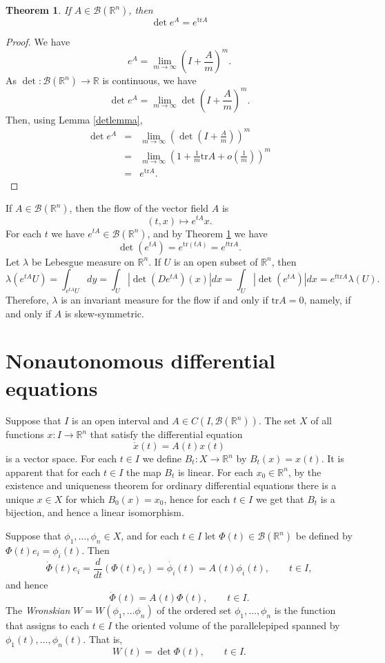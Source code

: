 \documentclass{article}
\newcommand{\tr}{\textrm{tr}}
\newtheorem{theorem}{Theorem}
\begin{document}
\begin{theorem}
If $A \in \mathscr{B}(\mathbb{R}^n)$, then
\[
\det e^A = e^{\tr A}
\]
\label{dettheorem}
\end{theorem}
\begin{proof}
We have
\[
e^A=\lim_{m \to \infty} \left(I+\frac{A}{m}\right)^m.
\]
As $\det:\mathscr{B}(\mathbb{R}^n) \to \mathbb{R}$ is continuous, we have
\[
\det e^A = \lim_{m \to \infty} \det  \left(I+\frac{A}{m}\right)^m.
\]
Then, using Lemma \ref{detlemma},
\begin{eqnarray*}
\det e^A&=&\lim_{m \to \infty} \left(\det  \left(I+\frac{A}{m}\right) \right)^m\\
&=&\lim_{m \to \infty} \left( 1+ \frac{1}{m}\tr A + o\left(\frac{1}{m}\right) \right)^m\\
&=&e^{\tr A}.
\end{eqnarray*}
\end{proof}

If $A \in \mathscr{B}(\mathbb{R}^n)$, then the flow of the vector field $A$ is 
\[
(t,x) \mapsto e^{tA}x.
\]
For each $t$ we have $e^{tA} \in \mathscr{B}(\mathbb{R}^n)$, and by Theorem \ref{dettheorem} we have
\[
\det(e^{tA})= e^{\tr (tA)} = e^{t\tr A}.
\]
Let $\lambda$ be Lebesgue measure on $\mathbb{R}^n$. If $U$ is an open subset of $\mathbb{R}^n$, then
\[
\lambda(e^{tA}U) = \int_{e^{tA}U} dy= \int_U |\det(De^{tA})(x)| dx = \int_U |\det(e^{tA})| dx  = e^{t\tr A} \lambda(U).
\]
Therefore,  $\lambda$ is an invariant measure for the flow if and only if $\tr A=0$, namely, if and only if $A$ is skew-symmetric.


\section{Nonautonomous differential equations}
Suppose that $I$ is an open interval and $A \in C(I, \mathscr{B}(\mathbb{R}^n))$.
The set $X$ of all functions $x:I \to \mathbb{R}^n$ that satisfy   the differential equation
\[
\dot{x}(t)=A(t)x(t)
\]
is a vector space.
For each $t \in I$ we define $B_t:X \to \mathbb{R}^n$ by $B_t(x)=x(t)$. It is apparent that
for each $t \in I$ the map $B_t$ is linear.
For each $x_0 \in \mathbb{R}^n$, by the existence and uniqueness theorem for ordinary differential equations there is a unique $x \in X$ for
which $B_0(x)=x_0$, hence for each $t \in I$ we get that $B_t$ is a bijection, and hence a linear isomorphism.

Suppose that $\phi_1,\ldots,\phi_n \in X$, 
and for each $t \in I$ let $\Phi(t) \in \mathscr{B}(\mathbb{R}^n)$ be defined by $\Phi(t)e_i = \phi_i(t)$. Then
\[
\dot{\Phi}(t)e_i = \frac{d}{dt}(\Phi(t)e_i) = \dot{\phi_i}(t) = A(t)\phi_i(t), \qquad t \in I,
\]
and hence 
\begin{equation}
\dot{\Phi}(t) = A(t) \Phi(t), \qquad t \in I.
\label{Phidot}
\end{equation}
The {\em Wronskian} $W=W(\phi_1,\ldots\phi_n)$ of the ordered set $\phi_1,\ldots,\phi_n$
is the function that assigns to each $t \in I$ the  oriented volume of the parallelepiped spanned by $\phi_1(t),\ldots,\phi_n(t)$. That is,
\[
W(t)=\det \Phi(t), \qquad t \in I.
\]
\end{document}
